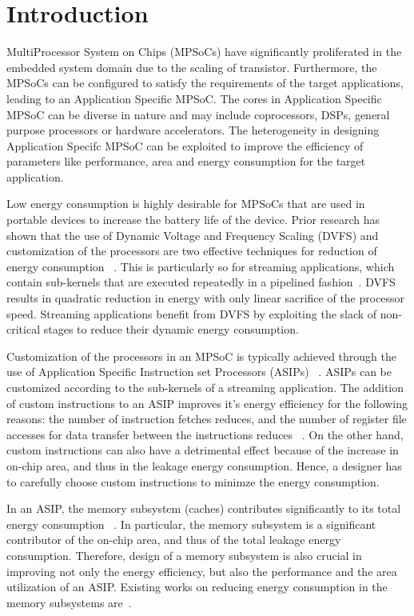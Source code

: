 \section{Introduction}
MultiProcessor System on Chips (MPSoCs) have significantly proliferated in the embedded system domain due to the scaling of transistor. Furthermore, the MPSoCs can be configured to satisfy the requirements of the target applications, leading to an Application Specific MPSoC. The cores in Application Specific MPSoC can be diverse in nature and may include coprocessors, DSPs,  general purpose processors or hardware accelerators. The heterogeneity in designing Application Specifc MPSoC can be exploited to improve the efficiency of parameters like performance, area and energy consumption for the target application.

Low energy consumption is highly desirable for MPSoCs that are used in portable devices to increase the battery life of the device. Prior research has shown that the use of Dynamic Voltage and Frequency Scaling (DVFS) and customization of the processors are two effective techniques for reduction of energy consumption ~\cite{energy_asip}. This is particularly so for
streaming applications, which contain sub-kernels that are executed
repeatedly in a pipelined fashion~\cite{pipeline}. DVFS results in quadratic
reduction in energy with only linear sacrifice of the processor speed.
Streaming applications benefit from DVFS by exploiting the slack of non-
critical stages to reduce their dynamic energy consumption.

Customization of the processors in an MPSoC is typically achieved through
the use of Application Specific Instruction set Processors (ASIPs) ~\cite{sun_asip}.
ASIPs can be customized according to the sub-kernels of a streaming
application. The addition of custom instructions to an ASIP improves it's
energy efficiency for the following reasons: the number of instruction
fetches reduces, and the number of register file accesses for data
transfer between the instructions reduces ~\cite{energy_custom}. On the other hand,
custom instructions can also have a detrimental effect because of the
increase in on-chip area, and thus in the leakage energy consumption.
Hence, a designer has to carefully choose custom instructions to minimze
the energy consumption. 

In an ASIP, the memory subsystem (caches) contributes significantly to
its total energy consumption ~\cite{mem_en1, mem_en2}. In particular, the memory subsystem
is a significant contributor of the on-chip area, and thus of the total
leakage energy consumption. Therefore, design of a memory subsystem
is also crucial in improving not only the energy efficiency, but also
the performance and the area utilization of an ASIP. Existing works on
reducing energy consumption in the memory subsystems are~\cite{mem_en2}. 

